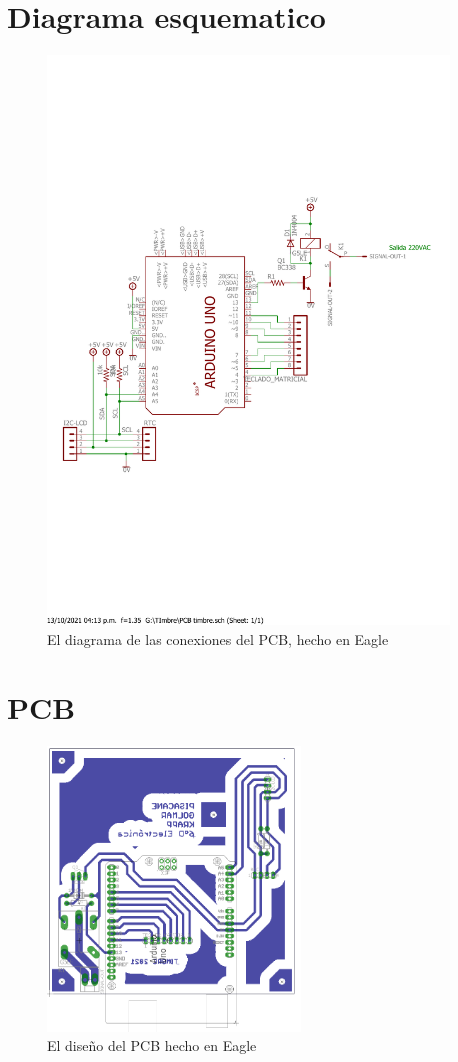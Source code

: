 \documentclass{article}
\begin{document}
\section{Diagrama esquematico}
\begin{figure}[H]
	\centering
	\includegraphics[width=0.95\textwidth]{sch_timbre.pdf}
	\caption{El diagrama de las conexiones del PCB, hecho en Eagle}
\end{figure}
	


\section{PCB}
\begin{figure}[H]
	\includegraphics[width=0.6\textwidth]{PCB.png}
	\centering
	\caption{El diseño del PCB hecho en Eagle}
\end{figure}
\end{document}
